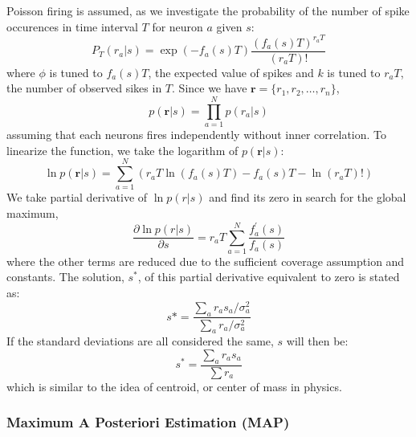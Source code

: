\documentclass[11pt]{article}
\begin{document}
Poisson firing is assumed, as we investigate the probability of the number of spike occurences in time interval $T$ for neuron $a$ given $s$:
\begin{equation*}
    P_T(r_a|s)=\exp(-f_a(s)T)\frac{(f_a(s)T)^{r_aT}}{(r_aT)!}
\end{equation*}
where $\phi$ is tuned to $f_a(s)T$, the expected value of spikes and $k$ is tuned to $r_aT$, the number of observed sikes in $T$. Since we have $\mathbf{r}=\{r_1,r_2, \ldots,r_n\}$,
\begin{equation*}
    p(\mathbf{r}|s)=\prod_{a=1}^N p(r_a|s)
\end{equation*}
assuming that each neurons fires independently without inner correlation. To linearize the function, we take the logarithm of $p(\mathbf{r}|s)$:
\begin{equation*}
    \ln p(\mathbf{r}|s)=\sum_{a=1}^N (r_aT\ln (f_a(s)T)-f_a(s)T-\ln(r_aT)!)
\end{equation*}
We take partial derivative of $\ln p(r|s)$ and find its zero in search for the global maximum,
\begin{equation*}
    \frac{\partial \ln p(r|s)}{\partial s} = r_aT \sum_{a=1}^N \frac{f_a^{'}(s)}{f_a(s)}
\end{equation*}
where the other terms are reduced due to the sufficient coverage assumption and constants. The solution, $s^*$, of this partial derivative equivalent to zero is stated as:
\begin{equation*}
    s* = \frac{\sum_a r_as_a / \sigma^2_a}{\sum_a r_a / \sigma^2_a}
\end{equation*}
If the standard deviations are all considered the same, $s$ will then be:
\begin{equation*}
    s^*=\frac{\sum_a r_as_a}{\sum r_a}
\end{equation*}
which is similar to the idea of centroid, or center of mass in physics.

\subsubsection{Maximum A Posteriori Estimation (MAP)}
\end{document}
